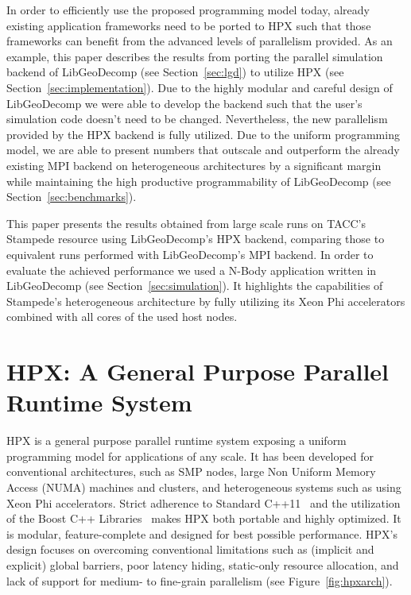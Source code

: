 \documentclass{sig-alternate}
\newcommand{\upp}{\vspace*{-0.5em}}
\newcommand{\up}{\vspace*{-0.25em}}
\begin{document}
In order to efficiently use the proposed programming model today, already existing application frameworks need to be ported to HPX
such that those frameworks can benefit from the advanced levels of parallelism provided.
As an example, this paper describes the results from porting the parallel
simulation backend of LibGeoDecomp (see Section~\ref{sec:lgd})
to utilize HPX (see Section~\ref{sec:implementation}). Due to the highly modular
and careful design of LibGeoDecomp we were able to develop
the backend such that the user's simulation code doesn't need to be changed. Nevertheless, the new parallelism provided
by the HPX backend is fully utilized. Due to the uniform programming model, we are
able to present numbers that outscale and outperform the already existing MPI backend on heterogeneous
architectures by a significant margin
while maintaining the high productive programmability of LibGeoDecomp (see Section~\ref{sec:benchmarks}).

This paper presents the results obtained from large scale runs on TACC's Stampede
resource\cite{stampede_tacc} using LibGeoDecomp's HPX backend, comparing those to
equivalent runs performed with LibGeoDecomp's MPI backend. In order to evaluate the
achieved performance we used a N-Body application written in LibGeoDecomp (see Section~\ref{sec:simulation}).
It highlights the capabilities of Stampede's heterogeneous architecture by fully utilizing
its Xeon Phi accelerators \cite{xeon_phi_webpage} combined with all cores of
the used host nodes.

\section{HPX: A General Purpose Paral\-lel Runtime System}
\label{sec:hpx}

HPX is a
general purpose parallel runtime system exposing a uniform programming model for applications of
any scale. It has been developed for
conventional architectures, such as SMP nodes, large Non Uniform Memory Access (NUMA) machines and
clusters, and heterogeneous systems such as using Xeon Phi accelerators. Strict adherence to Standard
C++11~\cite{cxx11_standard} and the utilization of the Boost C++
Libraries~\cite{boostcpplibraries} makes HPX both portable and highly
optimized. It is modular, feature-complete and designed for best possible
performance. HPX's design focuses on overcoming conventional limitations such as (implicit and explicit) global
barriers, poor latency hiding, static-only resource allocation, and lack of support for medium- to fine-grain
parallelism (see Figure~\ref{fig:hpxarch}).
\end{document}
